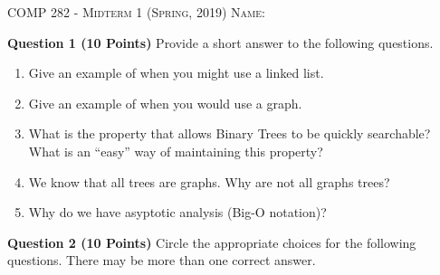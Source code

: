 \documentclass{letter}
\newcommand{\heading}[1]{{\large \textsc{#1}}}
\begin{document}
\heading{COMP 282 - Midterm 1 (Spring, 2019)}
\kern 2cm
\heading{Name:}

{\bf Question 1 (10 Points)} \kern 0.5cm Provide a short answer to the following
questions.

\begin{enumerate}[a]

\item Give an example of when you might use a linked list.

\vspace{3cm}

\item Give an example of when you would use a graph.

\vspace{3cm}

\item What is the property that allows Binary Trees to be quickly searchable?
What is an ``easy'' way of maintaining this property?

\vspace{3cm}

\item We know that all trees are graphs.  Why are not all graphs trees?

\vspace{3cm}

\item Why do we have asyptotic analysis (Big-O notation)?

\end{enumerate}

\clearpage

{\bf Question 2 (10 Points)} \kern 0.5cm Circle the appropriate choices for the
following questions.  There may be more than one correct answer.
\end{document}
